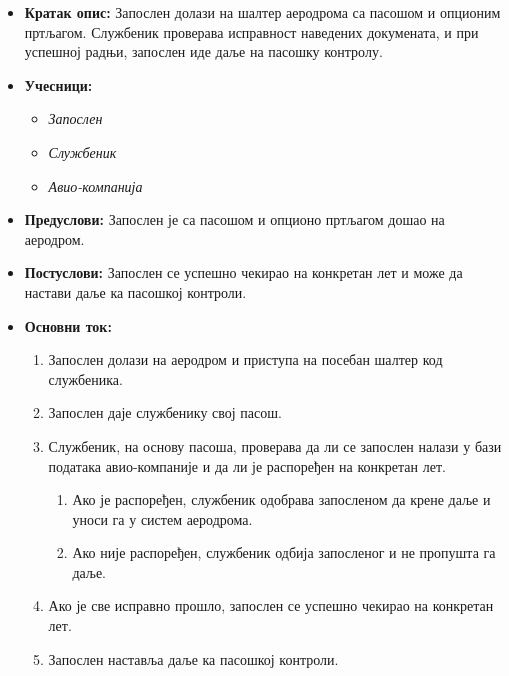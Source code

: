 \documentclass{article}
\begin{document}
\begin{itemize}
    \item \textbf{Кратак опис:} Запослен долази на шалтер аеродрома са пасошом и опционим пртљагом. Службеник проверава исправност наведених докумената, и при успешној радњи, запослен иде даље на пасошку контролу.
    \item \textbf{Учесници:}
        \begin{itemize}
            \item \textit{Запослен}
            \item \textit{Службеник}
            \item \textit{Авио-компанија}
        \end{itemize}
    \item \textbf{Предуслови:} Запослен је са пасошом и опционо пртљагом дошао на аеродром.
    \item \textbf{Постуслови:} Запослен се успешно чекирао на конкретан лет и може да настави даље ка пасошкој контроли.
    \item \textbf{Основни ток:}
        \begin{enumerate}
            \item Запослен долази на аеродром и приступа на посебан шалтер код службеника.
            \item Запослен даје службенику свој пасош.
            \item Службеник, на основу пасоша, проверава да ли се запослен налази у бази података авио-компаније и да ли је распоређен на конкретан лет.
                \begin{enumerate}
                    \item Ако је распоређен, службеник одобрава запосленом да крене даље и уноси га у систем аеродрома.
                    \item Ако није распоређен, службеник одбија запосленог и не пропушта га даље.
                \end{enumerate}
            \item Ако је све исправно прошло, запослен се успешно чекирао на конкретан лет.
            \item Запослен наставља даље ка пасошкој контроли.
        \end{enumerate}
\end{itemize}
\end{document}
